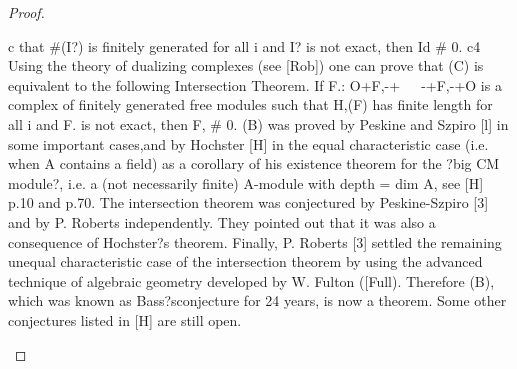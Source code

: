 \begin{proof}
\begin{mathematicalrecord}
c             that #(I?) is finitely generated for all i and I? is not exact, then
              Id # 0.
c4
Using the theory of dualizing complexes (see [Rob])            one can prove that (C)
is equivalent to the following
Intersection Theorem. If F.: O+F,-+~~~-+F,-+O         is a complex of finitely
generated free modules such that H,(F) has finite length for all i and F. is
not exact, then F, # 0.
   (B) was proved by Peskine and Szpiro [l] in some important cases,and
by Hochster [H] in the equal characteristic case (i.e. when A contains a
field) as a corollary of his existence theorem for the ?big CM module?, i.e. a
(not necessarily finite) A-module with depth = dim A, see [H] p.10 and
p.70. The intersection theorem was conjectured by Peskine-Szpiro [3] and
by P. Roberts independently. They pointed out that it was also a
consequence of Hochster?s theorem. Finally, P. Roberts [3] settled the
remaining unequal characteristic case of the intersection theorem by using
the advanced technique of algebraic geometry developed by W. Fulton
([Full). Therefore (B), which was known as Bass?sconjecture for 24 years,
is now a theorem. Some other conjectures listed in [H] are still open.
\end{mathematicalrecord}
\end{proof}
